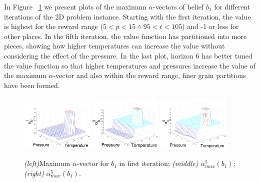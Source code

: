 \documentclass{article} %
\begin{document}
In Figure ~\ref{fig:3D}  we present plots of the maximum $\alpha$-vectors of belief $b_1$ for different iterations of the 2D problem instance. %
Starting with the first iteration, the value is highest for the reward range ($5<p<15 \wedge 95<t<105$) and -1 or less for other places. In the fifth iteration, the value function has partitioned into more pieces, showing how higher temperatures can increase the value without considering the effect of the pressure. In the last plot, horizon 6 has better tuned the value function so that higher temperatures and pressures increase the value of the maximum $\alpha$-vector and also within the reward range, finer grain partitions have been formed. %
\begin{figure}[tbp!]
\vspace{-2mm}
\centering
\includegraphics[width=0.31\textwidth]{pics/2d1.pdf}
\includegraphics[width=0.31\textwidth]{pics/2d9.pdf}
\includegraphics[width=0.31\textwidth]{pics/2d111.pdf}
\vspace{-3mm}
\caption{\footnotesize 
{\it (left)}Maximum $\alpha$-vector for $b_1$ in first iteration; 
{\it (middle)} $\alpha_{max}^5(b_1)$; 
{\it (right)} $\alpha_{max}^5(b_1)$.%
}
\label{fig:3D}
\vspace{-4mm}
\end{figure}
\end{document}
